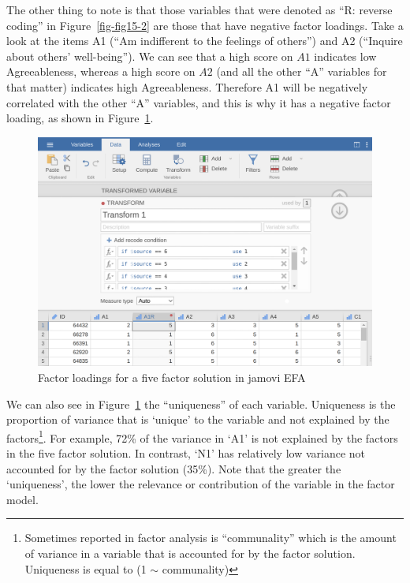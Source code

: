 \documentclass[
  a4paper,
]{book}
\begin{document}
The other thing to note is that those variables that were denoted as
``R: reverse coding'' in Figure~\ref{fig-fig15-2} are those that have
negative factor loadings. Take a look at the items A1 (``Am indifferent
to the feelings of others'') and A2 (``Inquire about others'
well-being''). We can see that a high score on \(A1\) indicates low
Agreeableness, whereas a high score on \(A2\) (and all the other ``A''
variables for that matter) indicates high Agreeableness. Therefore A1
will be negatively correlated with the other ``A'' variables, and this
is why it has a negative factor loading, as shown in
Figure~\ref{fig-fig15-7}.

\begin{figure}

\includegraphics[width=1\textwidth,height=\textheight]{images/fig15-7.png} \hfill{}

\caption{\label{fig-fig15-7}Factor loadings for a five factor solution
in jamovi EFA}

\end{figure}

We can also see in Figure~\ref{fig-fig15-7} the ``uniqueness'' of each
variable. Uniqueness is the proportion of variance that is `unique' to
the variable and not explained by the factors\footnote{Sometimes
  reported in factor analysis is ``communality'' which is the amount of
  variance in a variable that is accounted for by the factor solution.
  Uniqueness is equal to (1 \(\sim\) communality)}. For example, 72\% of
the variance in `A1' is not explained by the factors in the five factor
solution. In contrast, `N1' has relatively low variance not accounted
for by the factor solution (35\%). Note that the greater the
`uniqueness', the lower the relevance or contribution of the variable in
the factor model.
\end{document}

